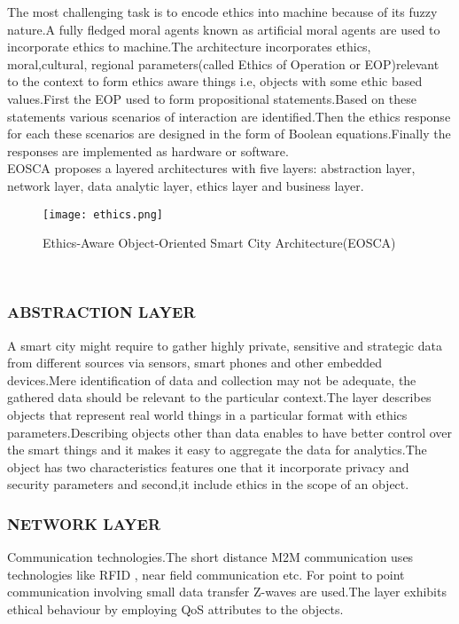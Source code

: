 \documentclass[10pt,a4paper,journal]{IEEEtran}
\begin{document}
\hspace{2em}The most challenging task is to encode ethics into machine because of its fuzzy nature.A fully fledged moral agents known as artificial moral agents\cite{4} are used to incorporate ethics to machine.The architecture incorporates ethics, moral,cultural, regional parameters(called Ethics of Operation or EOP)relevant to the context to form ethics aware things i.e, objects with some ethic based values.First the EOP used to form propositional statements.Based on these statements various scenarios of interaction are identified.Then the ethics response for each these scenarios are designed in the form of Boolean equations.Finally the responses are implemented as hardware or software.\\

\hspace{2em}EOSCA \cite{3} proposes a layered architectures with five layers: abstraction layer, network layer, data analytic layer, ethics layer and business layer.\\
\begin{figure}[htbp]
\centering
\texttt{[image: ethics.png]}
\caption{Ethics-Aware Object-Oriented Smart City Architecture(EOSCA)\cite{3}}
\label{1}
\end{figure}
\\
\subsubsection{ABSTRACTION LAYER}
A smart city might require to gather highly private, sensitive and strategic data from different sources via sensors, smart phones and other embedded devices.Mere identification of data and collection may not be adequate, the gathered data should be relevant to the particular context.The layer describes objects that represent real world things in a particular format with ethics parameters.Describing objects other than data enables to have better control over the smart things and it makes it easy to aggregate the data for analytics.The object has two characteristics features one that it incorporate privacy and security parameters and second,it include ethics in the scope of an object.
\\
\subsubsection{NETWORK LAYER}
Communication technologies.The short distance M2M communication uses technologies like RFID \cite{2}, near field communication \cite{5} etc. For point to point communication involving small data transfer Z-waves are used.The layer exhibits ethical behaviour by employing QoS attributes to the objects.
\\
\end{document}
